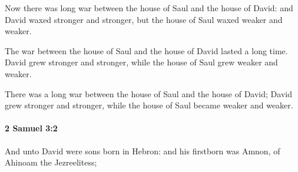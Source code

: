 			\begin{versebox}
					\item[BHS] 
					\item[ASV] Now there was long war between the house of Saul and the house of David: and David waxed stronger and stronger, but the house of Saul waxed weaker and weaker.
					\item[NIV] The war between the house of Saul and the house of David lasted a long time. David grew stronger and stronger, while the house of Saul grew weaker and weaker.
					\item[NRSV] There was a long war between the house of Saul and the house of David; David grew stronger and stronger, while the house of Saul became weaker and weaker.
			\end{versebox}

		\paragraph{2 Samuel 3:2} %
			\label{2SAMUEL-3-2}

			And unto David were sons born in Hebron: and his firstborn was Amnon, of Ahinoam the Jezreelitess;

